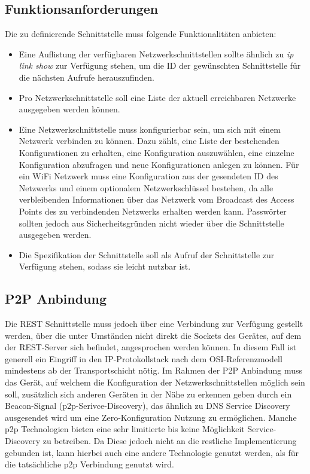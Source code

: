 	\subsection{Funktionsanforderungen}

    Die zu definierende Schnittstelle muss folgende Funktionalitäten anbieten:
    \begin{itemize}
        \item Eine Auflistung der verfügbaren Netzwerkschnittstellen sollte ähnlich zu {\it ip link show} zur Verfügung stehen, um die ID der gewünschten Schnittstelle für die nächsten Aufrufe herauszufinden.
        \item Pro Netzwerkschnittstelle soll eine Liste der aktuell erreichbaren Netzwerke ausgegeben werden können.
        \item Eine Netzwerkschnittstelle muss konfigurierbar sein, um sich mit einem Netzwerk verbinden zu können. Dazu zählt, eine Liste der bestehenden Konfigurationen zu erhalten, eine Konfiguration auszuwählen, eine einzelne Konfiguration abzufragen und neue Konfigurationen anlegen zu können. Für ein WiFi Netzwerk muss eine Konfiguration aus der gesendeten ID des Netzwerks und einem optionalem Netzwerkschlüssel bestehen, da alle verbleibenden Informationen über das Netzwerk vom Broadcast des Access Points des zu verbindenden Netzwerks erhalten werden kann.
        Passwörter sollten jedoch aus Sicherheitsgründen nicht wieder über die Schnittstelle ausgegeben werden.
        
        \item Die Spezifikation der Schnittstelle soll als Aufruf der Schnittstelle zur Verfügung stehen, sodass sie leicht nutzbar ist.
    \end{itemize}
    
    \subsection{P2P Anbindung}

	Die REST Schnittstelle muss jedoch über eine Verbindung zur Verfügung gestellt werden, über die unter Umständen nicht direkt die Sockets des Gerätes, auf dem der REST-Server sich befindet, angesprochen werden können. In diesem Fall ist generell ein Eingriff in den IP-Protokollstack nach dem OSI-Referenzmodell mindestens ab der Transportschicht nötig. Im Rahmen der P2P Anbindung muss das Gerät, auf welchem die Konfiguration der Netzwerkschnittstellen möglich sein soll, zusätzlich sich anderen Geräten in der Nähe zu erkennen geben durch ein Beacon-Signal (p2p-Serivce-Discovery), das ähnlich zu DNS Service Discovery ausgesendet wird um eine Zero-Konfiguration Nutzung zu ermöglichen.\cite{AI-Kaiser} Manche p2p Technologien bieten eine sehr limitierte bis keine Möglichkeit Service-Discovery zu betreiben. Da Diese jedoch nicht an die restliche Implementierung gebunden ist, kann hierbei auch eine andere Technologie genutzt werden, als für die tatsächliche p2p Verbindung genutzt wird.

